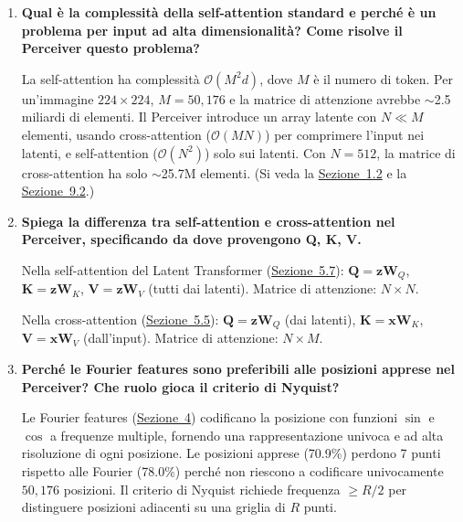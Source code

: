 \documentclass[12pt,a4paper]{article}
\begin{document}
\begin{enumerate}[label=\textbf{D\arabic*.}]

\item \textbf{Qual \`e la complessit\`a della self-attention standard e perch\'e \`e un problema per input ad alta dimensionalit\`a? Come risolve il Perceiver questo problema?}

\begin{proofbox}
La self-attention ha complessit\`a $\mathcal{O}(M^2 d)$, dove $M$ \`e il numero di token. Per un'immagine $224 \times 224$, $M = 50{,}176$ e la matrice di attenzione avrebbe $\sim$2.5 miliardi di elementi. Il Perceiver introduce un array latente con $N \ll M$ elementi, usando cross-attention ($\mathcal{O}(MN)$) per comprimere l'input nei latenti, e self-attention ($\mathcal{O}(N^2)$) solo sui latenti. Con $N = 512$, la matrice di cross-attention ha solo $\sim$25.7M elementi. (Si veda la \hyperref[sec:limite_transformer]{Sezione~1.2} e la \hyperref[sec:compl_perceiver]{Sezione~9.2}.)
\end{proofbox}

\item \textbf{Spiega la differenza tra self-attention e cross-attention nel Perceiver, specificando da dove provengono Q, K, V.}

\begin{proofbox}
Nella self-attention del Latent Transformer (\hyperref[sec:latent_detail]{Sezione~5.7}): $\mathbf{Q} = \mathbf{z}\mathbf{W}_Q$, $\mathbf{K} = \mathbf{z}\mathbf{W}_K$, $\mathbf{V} = \mathbf{z}\mathbf{W}_V$ (tutti dai latenti). Matrice di attenzione: $N \times N$.

Nella cross-attention (\hyperref[sec:ca_detail]{Sezione~5.5}): $\mathbf{Q} = \mathbf{z}\mathbf{W}_Q$ (dai latenti), $\mathbf{K} = \mathbf{x}\mathbf{W}_K$, $\mathbf{V} = \mathbf{x}\mathbf{W}_V$ (dall'input). Matrice di attenzione: $N \times M$.
\end{proofbox}

\item \textbf{Perch\'e le Fourier features sono preferibili alle posizioni apprese nel Perceiver? Che ruolo gioca il criterio di Nyquist?}

\begin{proofbox}
Le Fourier features (\hyperref[sec:fourier]{Sezione~4}) codificano la posizione con funzioni $\sin$ e $\cos$ a frequenze multiple, fornendo una rappresentazione univoca e ad alta risoluzione di ogni posizione. Le posizioni apprese (70.9\%) perdono 7 punti rispetto alle Fourier (78.0\%) perch\'e non riescono a codificare univocamente $50{,}176$ posizioni. Il criterio di Nyquist richiede frequenza $\geq R/2$ per distinguere posizioni adiacenti su una griglia di $R$ punti.
\end{proofbox}


\end{enumerate}
\end{document}
